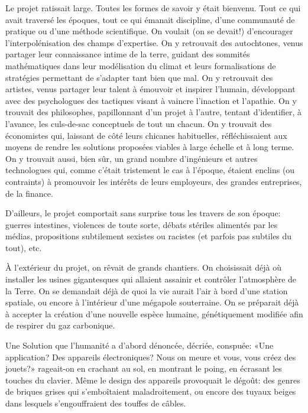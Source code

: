 Le projet \nomProjet{} ratissait large.  Toutes les formes de savoir y était
bienvenu.  
%
Tout ce qui avait traversé les époques, tout ce qui émanait discipline, d'une
communauté de pratique ou d'une méthode scientifique.
%
On voulait (on se devait!) d'encourager l'interpolénisation
des champs d'expertise.
On y retrouvait des autochtones, venus partager leur
connaissance intime de la terre, guidant des sommités mathé\-matiques dans leur
modélisation du climat et leurs formalisations de stra\-tégies permettant de
s'adapter tant bien que mal.  On y retrouvait des artistes, venus partager leur
talent à émouvoir et inspirer l'humain, développant avec des psychologues des
tactiques visant à vaincre l'in\-act\-ion et l'apathie.  On y trouvait des
philosophes, papillonnant d'un projet à l'autre, tentant d'identifier, à
l'avance, les culs-de-sac con\-cept\-uels de tout un chacun.  On y trouvait des
économistes qui, laissant de côté leurs chicanes habituelles, réfléchissaient
aux moyens de rendre les solutions proposées viables à large échelle et à long
terme.  On y trouvait aussi, bien sûr, un grand nombre d'ingénieurs et autres
technologues qui, comme c'était trist\-ement le cas à l'époque, étaient enclins
(ou contraints) à promouvoir les intérêts de leurs employeurs, des grandes
entreprises, de la finance.

D'ailleurs, le projet \nomProjet{} comportait sans surprise tous les
travers de son époque: guerres intestines, violences de toute sorte, débats
stériles alimentés par les médias, propositions
subti\-le\-ment sexistes ou racistes (et parfois pas subtiles du tout), etc.

À l'extérieur du projet, on rêvait de grands chantiers.  On choisissait
déjà où installer les usines gigantesques qui allaient assainir et
contrô\-ler l'at\-mosphère de la Terre. On se demandait déjà de quoi la vie
aurait l'air à bord d'une station spatiale, ou encore à l'intérieur d'une
mégapole souterraine. On se préparait déjà à accepter la création d'une
nouvelle espèce humaine, génétiquement modifiée afin de respirer du gaz
carbo\-nique.


Une Solution que l'humanité a d'abord dénoncée, décriée, conspuée: «Une
application? Des appareils électroniques? Nous on meure et vous, vous créez des
jouets?» rageait-on en crachant au sol, en montrant le poing, en écrasant
les touches du clavier.  Même le design des appareils provoquait le
dégoût: des genres de briques grises qui s'emboîtaient mala\-droi\-tement, ou
encore des tuyaux beiges dans lesquels s'engouffraient des touffes
de câbles.

